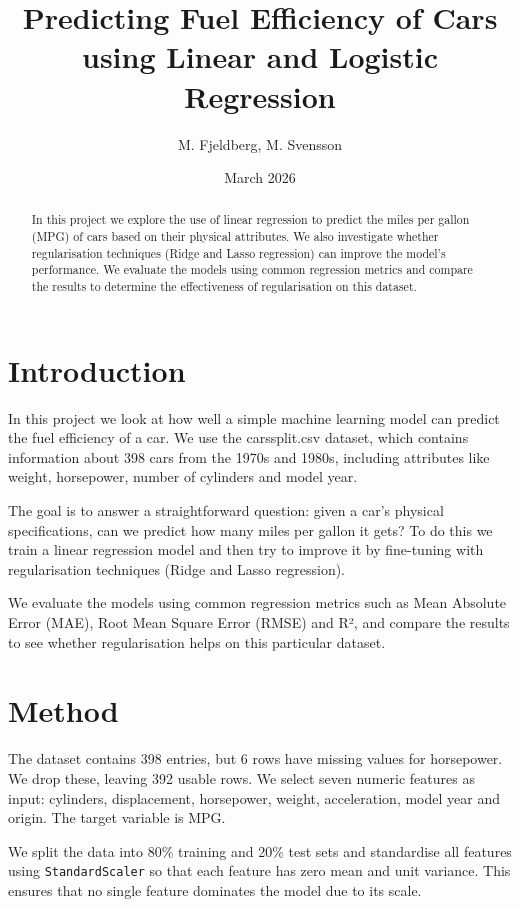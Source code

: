 \documentclass[a4paper, twocolumn]{article}
\title{Predicting Fuel Efficiency of Cars using Linear and Logistic Regression}
\author{M. Fjeldberg, M. Svensson}
\date{March 2026}
\begin{document}
\maketitle

\begin{abstract}
In this project we explore the use of linear regression to predict the miles per gallon (MPG)
of cars based on their physical attributes. We also investigate whether regularisation techniques (Ridge and Lasso regression) can improve the model's performance. We evaluate the models using common regression metrics and compare the results to determine the effectiveness of regularisation on this dataset.
\end{abstract}

\section{Introduction}

In this project we look at how well a simple machine learning model can predict the fuel efficiency of a car.
We use the carssplit.csv dataset, which contains information about 398 cars from the 1970s and 1980s, including attributes like weight, horsepower, number of cylinders and model year.

The goal is to answer a straightforward question: given a car's physical specifications, can we predict how many miles per gallon it gets?
To do this we train a linear regression model and then try to improve it by fine-tuning with regularisation techniques (Ridge and Lasso regression).

We evaluate the models using common regression metrics such as Mean Absolute Error (MAE), Root Mean Square Error (RMSE) and R², and compare the results to see whether regularisation helps on this particular dataset.

\section{Method}

The dataset contains 398 entries, but 6 rows have missing values for horsepower. We drop these, leaving 392 usable rows. We select seven numeric features as input: cylinders, displacement, horsepower, weight, acceleration, model year and origin. The target variable is MPG.

We split the data into 80\% training and 20\% test sets and standardise all features using \texttt{StandardScaler} so that each feature has zero mean and unit variance. This ensures that no single feature dominates the model due to its scale.
\end{document}
